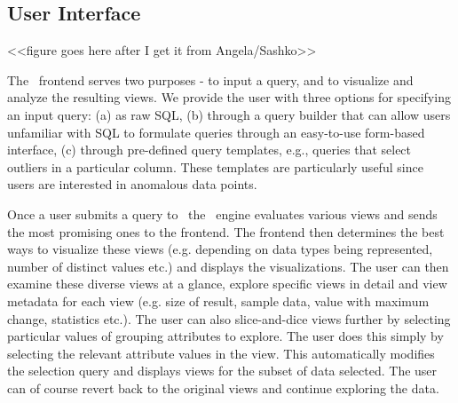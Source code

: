 \subsection{User Interface}
\label{user_interface}

<<figure goes here after I get it from Angela/Sashko>>

The \SeeDB\ frontend serves two purposes - to input a query, and to visualize
and analyze the resulting views. We provide the user with three options for
specifying an input query: (a) as raw SQL, (b) through a query builder that can
allow users unfamiliar with SQL to formulate queries through an easy-to-use
form-based interface, (c) through pre-defined query templates, e.g., queries
that select outliers in a particular column. These templates are particularly
useful since users are interested in anomalous data points.

Once a user submits a query to \SeeDB\, the \SeeDB\ engine evaluates various
views and sends the most promising ones to the frontend. The frontend then
determines the best ways to visualize these views (e.g. depending on data types
being represented, number of distinct values etc.) and displays the
visualizations. The user can then examine these diverse views at a glance,
explore specific views in detail and view metadata for each view (e.g. size of
result, sample data, value with maximum change, statistics etc.). The user can
also slice-and-dice views further by selecting particular values of grouping
attributes to explore. The user does this simply by selecting the relevant
attribute values in the view. This automatically modifies the selection query
and displays views for the subset of data selected. The user can of course
revert back to the original views and continue exploring the data.
